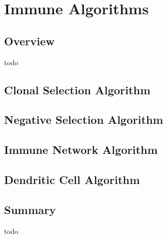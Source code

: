\chapter{Immune Algorithms}
\label{ch:immune}

\section{Overview}
todo

\section{Clonal Selection Algorithm}
\section{Negative Selection Algorithm}
\section{Immune Network Algorithm}
\section{Dendritic Cell Algorithm}

\section{Summary}
todo
